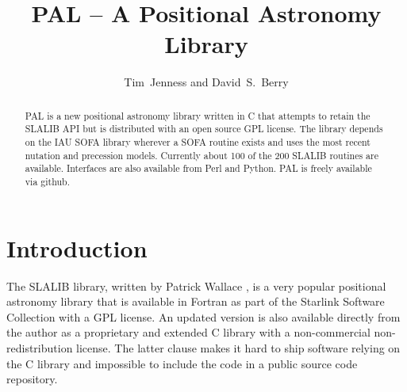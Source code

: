 
\resetcounters




\title{PAL -- A Positional Astronomy Library}
\author{Tim~Jenness and David~S.~Berry
}


\begin{abstract}
 PAL is a new positional astronomy library written in C that attempts to retain the SLALIB API but is distributed with an open source GPL license. The library depends on the IAU SOFA library wherever a SOFA routine exists and uses the most recent nutation and precession models. Currently about 100 of the 200 SLALIB routines are available. Interfaces are also available from Perl and Python. PAL is freely available via github.
\end{abstract}

\section{Introduction}

The SLALIB library, written by Patrick Wallace \citep{1994ASPC...61..481W}, is a very popular positional astronomy library that is available in Fortran as part of the Starlink Software Collection \citep[e.g.][]{2009ASPC..411..418J} with a GPL license. An updated version is also available directly from the author as a proprietary and extended C library with a non-commercial non-redistribution license. The latter clause makes it hard to ship software relying on the C library and impossible to include the code in a public source code repository.

